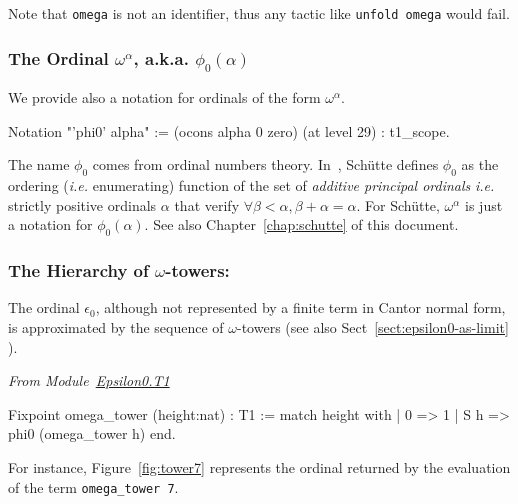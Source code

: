 Note that \texttt{omega} is not an identifier, thus any tactic like \texttt{unfold omega} would fail.


\subsubsection{The Ordinal \(\omega^\alpha\), a.k.a. \(\phi_0(\alpha)\)}
\label{sect:notation-phi0}
We provide also a notation for ordinals of the form $\omega^\alpha$.


\begin{Coqsrc}
Notation "'phi0' alpha" := (ocons alpha 0 zero) (at level 29) : t1_scope.
\end{Coqsrc}


\begin{remark}
\label{sec:orgheadline69}
The name \(\phi_0\)
   comes from ordinal numbers theory. In~\cite{schutte}, Schütte defines 
$\phi_0$  as the ordering (\emph{i.e.} enumerating) function of the set  of \emph{additive principal ordinals} \emph{i.e.} strictly positive ordinals $\alpha$ that verify $\forall \beta<\alpha, \beta+\alpha=\alpha$. For Schütte,  $\omega^\alpha$ is just a notation for $\phi_0(\alpha)$.  See also Chapter~\ref{chap:schutte} of this document.
\end{remark}



  
\subsubsection{The Hierarchy of \(\omega\)-towers:}
\label{sec:orgheadline71}

The ordinal $\epsilon_0$, although not represented by a finite term in Cantor normal form, is approximated by the sequence of $\omega$-towers (see also Sect~\vref{sect:epsilon0-as-limit} ).

\vspace{4pt}
\emph{From Module~\href{../theories/html/hydras.Epsilon0.T1.html}{Epsilon0.T1}}

\begin{Coqsrc}
Fixpoint omega_tower (height:nat) : T1 := 
 match height with 
 | 0 =>  1 
 | S h => phi0 (omega_tower h)
 end.
\end{Coqsrc}

For instance, Figure~\ref{fig:tower7} represents  the ordinal returned by the
 evaluation of the term \texttt{omega\_tower 7}.

